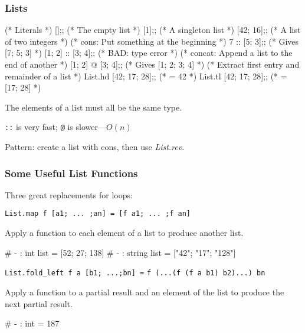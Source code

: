 \documentclass{plt}
\begin{document}
\begin{frame}[fragile]
  \frametitle{Lists}
\begin{ocaml}
(* Literals *)
[];;               (* The empty list *)
[1];;              (* A singleton list *)
[42; 16];;         (* A list of two integers *)
(* cons: Put something at the beginning *)
7 :: [5; 3];;      (* Gives [7; 5; 3] *)
[1; 2] :: [3; 4];; (* BAD: type error *)
(* concat: Append a list to the end of another *)
[1; 2] @ [3; 4];;  (* Gives [1; 2; 3; 4] *)
(* Extract first entry and remainder of a list *)
List.hd [42; 17; 28];; (* = 42 *)
List.tl [42; 17; 28];; (* = [17; 28] *)
\end{ocaml}

The elements of a list must all be the same type.

\verb|::| is very fast; \verb|@| is slower---$O(n)$

Pattern: create a list with cons, then use \emph{List.rev}.

\end{frame}

\begin{frame}[fragile]
  \frametitle{Some Useful List Functions}

Three great replacements for loops:

\verb|List.map f [a1; ... ;an] = [f a1; ... ;f an]|

Apply a function to each element of a list to produce another list.

\begin{interactive}
# 
- : int list = [52; 27; 138]
# 
- : string list = ["42"; "17"; "128"]
\end{interactive}
\verb|List.fold_left f a [b1; ...;bn] =| \verb|f (...(f (f a b1) b2)...) bn|

Apply a function to a partial result and an element of the list to
produce the next partial result.

\begin{interactive}
# 
- : int = 187
\end{interactive}

\end{frame}
\end{document}
